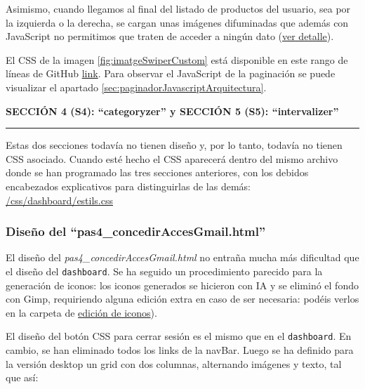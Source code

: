 \documentclass[a4paper,12pt]{report}
\begin{document}
	Asimismo, cuando llegamos al final del listado de productos del usuario, sea por la izquierda o la derecha, se cargan unas imágenes difuminadas que además con JavaScript no permitimos que traten de acceder a ningún dato (\href{https://github.com/blackcub3s/mercApp/blob/main/APP%20WEB/__frontend__produccio__/app/img/dashboard/paginadorEsqDifuminat.png}{ver detalle}).
	
	El CSS de la imagen \ref{fig:imatgeSwiperCustom} está disponible en este rango de líneas de GitHub \href{https://github.com/blackcub3s/mercApp/blob/4ddc34194763af7a246ffabb14146ad9b4b2c5db/APP%20WEB/__frontend__produccio__/app/css/dashboard/estils.css#L155}{link}. Para observar el JavaScript de la paginación se puede visualizar el apartado \ref{sec:paginadorJavascriptArquitectura}.
	
	
	
	
	\noindent \textbf{SECCIÓN 4 (S4): ``categoryzer'' y SECCIÓN 5 (S5): ``intervalizer''}
	\hrule
	\vspace{.5em}
	
	Estas dos secciones todavía no tienen diseño y, por lo tanto, todavía no tienen CSS asociado. Cuando esté hecho el CSS aparecerá dentro del mismo archivo donde se han programado las tres secciones anteriores, con los debidos encabezados explicativos para distinguirlas de las demás: \href{https://github.com/blackcub3s/mercApp/blob/4ddc34194763af7a246ffabb14146ad9b4b2c5db/APP%20WEB/__frontend__produccio__/app/css/dashboard/estils.css}{/css/dashboard/estils.css}
	
	
	\subsubsection{Diseño del ``pas4\_concedirAccesGmail.html''}
	\label{sec:dissenyHtmlCSSpas4}
	
	El diseño del \textit{pas4\_concedirAccesGmail.html} no entraña mucha más dificultad que el diseño del \texttt{dashboard}. Se ha seguido un procedimiento parecido para la generación de iconos: los iconos generados se hicieron con IA y se eliminó el fondo con Gimp, requiriendo alguna edición extra en caso de ser necesaria: podéis verlos en la carpeta de \href{https://github.com/blackcub3s/mercApp/tree/main/creacioIconos/iconosPas4}{edición de iconos}).
	
	El diseño del botón CSS para cerrar sesión es el mismo que en el \texttt{dashboard}. En cambio, se han eliminado todos los links de la navBar. Luego se ha definido para la versión desktop un grid con dos columnas, alternando imágenes y texto, tal que así:
	
\end{document}
